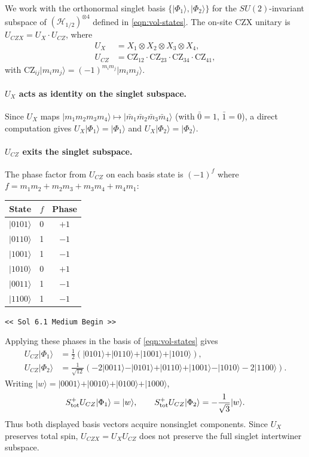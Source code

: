 \documentclass[preprint]{SciPost}
\newcommand{\mc}[1]{\mathcal{#1}}
\newcommand{\ket}[1]{\vert #1 \rangle}
\theoremstyle{plain} %
\newcommand{\GPTBegin}{\par\noindent\textcolor{GPTMarker}{\texttt{\textless\textless{} Sol 6.1 Medium Begin \textgreater\textgreater}}\par}
\begin{document}
We work with the orthonormal singlet basis $\{\ket{\Phi_1},\ket{\Phi_2}\}$ for the $SU(2)$-invariant subspace of $(\mc{H}_{1/2})^{\otimes 4}$ defined in \eqref{eqn:vol-states}. The on-site CZX unitary is $U_{CZX} = U_X \cdot U_{CZ}$, where
\begin{align}
  U_X &= X_1\otimes X_2\otimes X_3\otimes X_4, \\
  U_{CZ} &= \mathrm{CZ}_{12}\cdot\mathrm{CZ}_{23}\cdot\mathrm{CZ}_{34}\cdot\mathrm{CZ}_{41},
\end{align}
with $\mathrm{CZ}_{ij}\ket{m_i m_j} = (-1)^{m_i m_j}\ket{m_i m_j}$.

\paragraph{$U_X$ acts as identity on the singlet subspace.}
Since $U_X$ maps $\ket{m_1 m_2 m_3 m_4}\mapsto\ket{\bar{m}_1\bar{m}_2\bar{m}_3\bar{m}_4}$ (with $\bar{0}=1$, $\bar{1}=0$), a direct computation gives $U_X\ket{\Phi_1} = \ket{\Phi_1}$ and $U_X\ket{\Phi_2} = \ket{\Phi_2}$.

\paragraph{$U_{CZ}$ exits the singlet subspace.}
The phase factor from $U_{CZ}$ on each basis state is $(-1)^f$ where $f = m_1m_2+m_2m_3+m_3m_4+m_4m_1$:

\begin{center}
\begin{tabular}{c|c|c}
  State & $f$ & Phase \\ \hline
  $\ket{0101}$ & 0 & $+1$ \\
  $\ket{0110}$ & 1 & $-1$ \\
  $\ket{1001}$ & 1 & $-1$ \\
  $\ket{1010}$ & 0 & $+1$ \\
  $\ket{0011}$ & 1 & $-1$ \\
  $\ket{1100}$ & 1 & $-1$ \\
\end{tabular}
\end{center}

\GPTBegin{}

Applying these phases in the basis of \eqref{eqn:vol-states} gives
\begin{align}
 U_{CZ}\ket{\Phi_1}&=\frac12(\ket{0101}+\ket{0110}+\ket{1001}+\ket{1010}),\\
 U_{CZ}\ket{\Phi_2}&=\frac1{\sqrt{12}}(-2\ket{0011}-\ket{0101}
 +\ket{0110}+\ket{1001}-\ket{1010}-2\ket{1100}).
\end{align}
Writing $\ket{w}=\ket{0001}+\ket{0010}+\ket{0100}+\ket{1000}$,
\begin{equation}
 S^+_{\rm tot}U_{CZ}\ket{\Phi_1}=\ket{w},\qquad
 S^+_{\rm tot}U_{CZ}\ket{\Phi_2}=-\frac1{\sqrt3}\ket{w}.
\end{equation}
Thus both displayed basis vectors acquire nonsinglet components. Since
$U_X$ preserves total spin, $U_{CZX}=U_XU_{CZ}$ does not preserve the full
singlet intertwiner subspace.
\end{document}

